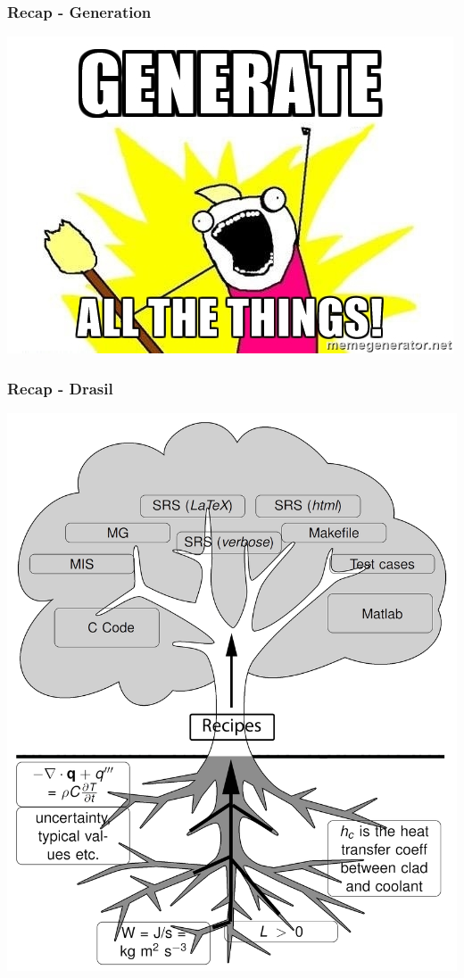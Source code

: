 \documentclass{beamer}
\begin{document}

\begin{frame}

\frametitle{Recap - Generation}
\begin{center}
\includegraphics[width=\textwidth]{generate_all_the_things.jpg}
\end{center}

\end{frame}


\begin{frame}

\frametitle{Recap - Drasil}
\begin{center}
	\includegraphics[width=.65\textwidth]{tree.png}
\end{center}

\end{frame}
\end{document}

